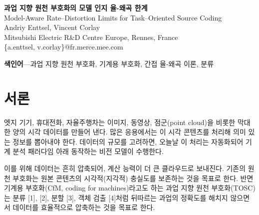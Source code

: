 \begin{center}
{\Large\bfseries 과업 지향 원천 부호화의 모델 인지 율-왜곡 한계}\\[0.4em]
{\normalsize Model-Aware Rate--Distortion Limits for Task--Oriented Source Coding}\\[0.8em]
Andriy Enttsel, Vincent Corlay\\
Mitsubishi Electric R\&D Centre Europe, Rennes, France\\
\{a.enttsel, v.corlay\}@fr.merce.mee.com
\end{center}

\begin{abstract}
과업 지향 원천 부호화(TOSC, task-oriented source coding)는 기계 중심 추론 시스템에서 시각 데이터를 효율적으로 전달하는 패러다임으로 떠올랐다. 이런 시스템에서는 자원 제약 아래 비트율, 지연, 과업 성능을 함께 최적화해야 한다. 최근 연구들이 기계용 부호화의 율-왜곡 한계를 제시했지만, 이 결과들은 흔히 과업 식별 가능성에 대한 강한 가정에 기대며 실제로 배치된 과업 모델의 영향을 무시한다. 이 연구에서는 간접 율-왜곡 이론의 관점에서 단일 과업 TOSC의 근본 한계를 다시 살펴본다. 먼저 기존 율-왜곡 한계가 달성 가능한 조건을 밝히고, 현실적인 환경에서 그 한계가 어떻게 드러나는지 보인다. 이어서 과업 모델의 비최적성과 구조적 제약을 반영하는, 과업 모델을 인지하는 율-왜곡 한계를 도입한다. 표준 분류 벤치마크 실험에서 현재의 학습형 TOSC 방식이 이 한계에서 멀리 떨어져 동작함을 확인했으며, 이로부터 송신기 쪽 복잡도가 핵심 병목임을 알 수 있다.
\end{abstract}

\noindent\textbf{색인어}---과업 지향 원천 부호화, 기계용 부호화, 간접 율-왜곡 이론, 분류

\section{서론}
엣지 기기, 휴대전화, 자율주행차는 이미지, 동영상, 점군(point cloud)을 비롯한 막대한 양의 시각 데이터를 만들어 낸다. 많은 응용에서는 이 시각 콘텐츠를 처리해 의미 있는 정보를 뽑아내야 한다. 데이터의 규모를 고려하면, 오늘날 이 처리는 자동화되어 기계 분석 패러다임 아래 동작하는 비전 모델이 수행한다.

이를 위해 데이터는 흔히 압축되어, 계산 능력이 더 큰 클라우드로 보내진다. 기존의 원천 부호화는 원본 콘텐츠의 시각적(지각적) 충실도를 보존하는 것을 목표로 한다. 반면 기계용 부호화(CfM, coding for machines)라고도 하는 과업 지향 원천 부호화(TOSC)는 분류 [1], [2], 분할 [3], 객체 검출 [4]처럼 뒤따르는 과업의 정확도를 해치지 않으면서 데이터를 효율적으로 압축하는 것을 목표로 한다.

